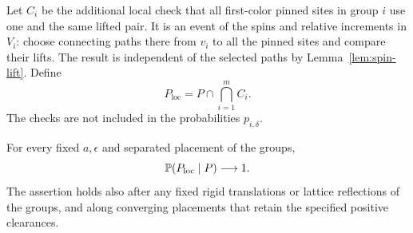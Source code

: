 Let $C_i$ be the additional local check that all first-color pinned
sites in group $i$ use one and the same lifted pair.  It is an event
of the spins and relative increments in $V_i$: choose connecting paths
there from $v_i$ to all the pinned sites and compare their lifts.
The result is independent of the selected paths by
Lemma~\ref{lem:spin-lift}.  Define
\begin{equation}\label{pins:checked-event}
 P_{\mathrm{loc}}=P\cap\bigcap_{i=1}^m C_i.
\end{equation}
The checks are not included in the probabilities $p_{i,\delta}$.

\begin{lemma}\label{pins:marker-checks}
For every fixed $a,\epsilon$ and separated placement of the groups,
\begin{equation}\label{pins:check-success}
 \mathbb P(P_{\mathrm{loc}}\mid P)\longrightarrow1.
\end{equation}
The assertion holds also after any fixed rigid translations or lattice
reflections of the groups, and along converging placements that retain
the specified positive clearances.
\end{lemma}

